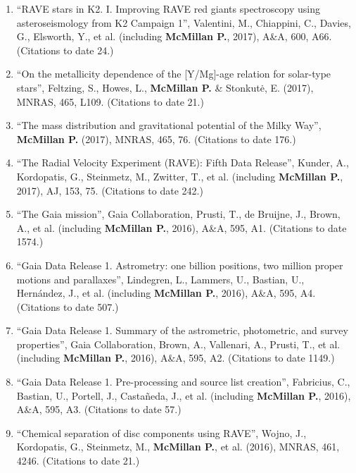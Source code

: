 \documentclass{resume}
\begin{document}
\begin{enumerate}
\item ``RAVE stars in K2. I. Improving RAVE red giants spectroscopy using asteroseismology from K2 Campaign 1'', Valentini, M., Chiappini, C., Davies, G., Elsworth, Y., et al. (including \textbf{McMillan P.}, 2017), A\&A, 600, A66. (Citations to date 24.)

\item ``On the metallicity dependence of the [Y/Mg]-age relation for solar-type stars'', Feltzing, S., Howes, L., \textbf{McMillan P.} \& Stonkut\.{e}, E. (2017), MNRAS, 465, L109. (Citations to date 21.)

\item ``The mass distribution and gravitational potential of the Milky Way'', \textbf{McMillan P.} (2017), MNRAS, 465, 76. (Citations to date 176.)

\item ``The Radial Velocity Experiment (RAVE): Fifth Data Release'', Kunder, A., Kordopatis, G., Steinmetz, M., Zwitter, T., et al. (including \textbf{McMillan P.}, 2017), AJ, 153, 75. (Citations to date 242.)

\item ``The Gaia mission'', Gaia Collaboration, Prusti, T., de Bruijne, J., Brown, A., et al. (including \textbf{McMillan P.}, 2016), A\&A, 595, A1. (Citations to date 1574.)

\item ``Gaia Data Release 1. Astrometry: one billion positions, two million proper motions and parallaxes'', Lindegren, L., Lammers, U., Bastian, U., Hern\'andez, J., et al. (including \textbf{McMillan P.}, 2016), A\&A, 595, A4. (Citations to date 507.)

\item ``Gaia Data Release 1. Summary of the astrometric, photometric, and survey properties'', Gaia Collaboration, Brown, A., Vallenari, A., Prusti, T., et al. (including \textbf{McMillan P.}, 2016), A\&A, 595, A2. (Citations to date 1149.)

\item ``Gaia Data Release 1. Pre-processing and source list creation'', Fabricius, C., Bastian, U., Portell, J., Casta\~neda, J., et al. (including \textbf{McMillan P.}, 2016), A\&A, 595, A3. (Citations to date 57.)

\item ``Chemical separation of disc components using RAVE'', Wojno, J., Kordopatis, G., Steinmetz, M., \textbf{McMillan P.}, et al. (2016), MNRAS, 461, 4246. (Citations to date 21.)


\end{enumerate}
\end{document}
